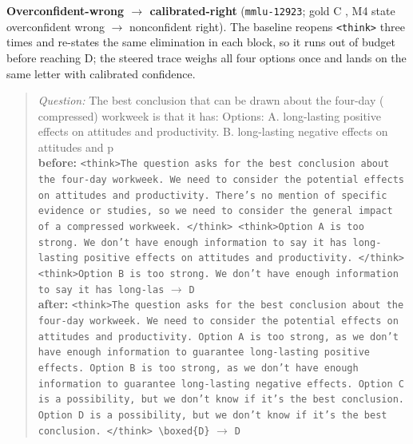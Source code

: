\noindent\textbf{Overconfident-wrong $\to$ calibrated-right} (\texttt{mmlu-12923}; gold C
, M4 state overconfident wrong $\to$ nonconfident right). The baseline reopens
\texttt{<think>} three times and re-states the same elimination in each block, so it runs out
of budget before reaching D; the steered trace weighs all four options once and lands on the
same letter with calibrated confidence.
\begin{quote}\scriptsize\emph{Question:} The best conclusion that can be drawn about the four-day ( compressed) workweek is that it has: Options: A. long-lasting positive effects on attitudes and productivity. B. long-lasting negative effects on attitudes and p\\[2pt]
\textbf{before:} \texttt{\textless{}think\textgreater{}The question asks for the best conclusion about the four-day workweek. We need to consider the potential effects on attitudes and productivity. There's no mention of specific evidence or studies, so we need to consider the general impact of a compressed workweek. \textless{}/think\textgreater{} \textless{}think\textgreater{}Option A is too strong. We don't have enough information to say it has long-lasting positive effects on attitudes and productivity. \textless{}/think\textgreater{} \textless{}think\textgreater{}Option B is too strong. We don't have enough information to say it has long-las} $\to$ \texttt{D}\\[2pt]
\textbf{after:} \texttt{\textless{}think\textgreater{}The question asks for the best conclusion about the four-day workweek. We need to consider the potential effects on attitudes and productivity. Option A is too strong, as we don't have enough information to guarantee long-lasting positive effects. Option B is too strong, as we don't have enough information to guarantee long-lasting negative effects. Option C is a possibility, but we don't know if it's the best conclusion. Option D is a possibility, but we don't know if it's the best conclusion. \textless{}/think\textgreater{} \textbackslash boxed\{D\}} $\to$ \texttt{D}
\end{quote}

